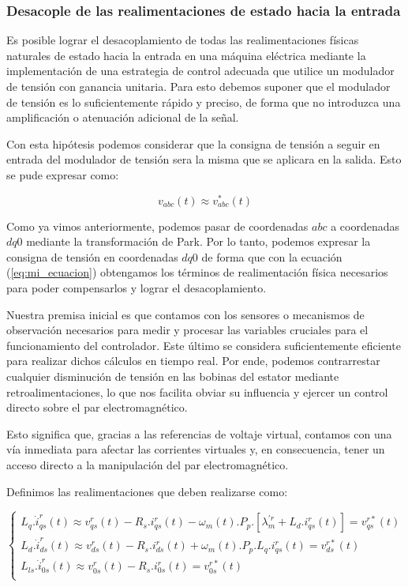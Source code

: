 \documentclass{article}
\begin{document}

\subsubsection{Desacople de las realimentaciones de estado hacia la entrada}

Es posible lograr el desacoplamiento de todas las realimentaciones físicas naturales de 
estado hacia la entrada en una máquina eléctrica mediante la implementación de una estrategia 
de control adecuada que utilice un modulador de tensión con ganancia unitaria. Para esto debemos 
suponer que el modulador de tensión es lo suficientemente rápido y preciso, de forma que no 
introduzca una amplificación o atenuación adicional de la señal. 

Con esta hipótesis podemos considerar que la consigna de tensión a seguir en entrada del modulador 
de tensión sera la misma que se aplicara en la salida. Esto se pude expresar como: 

\begin{equation}
    v_{abc}(t) \approx v^*_{abc}(t)
\end{equation}

Como ya vimos anteriormente, podemos pasar de coordenadas $abc$ a coordenadas $dq0$ mediante la
transformación de Park. Por lo tanto, podemos expresar la consigna de tensión en coordenadas $dq0$
de forma que con la ecuación (\ref{eq:mi_ecuacion}) obtengamos los términos de  realimentación física 
necesarios para poder compensarlos y lograr el desacoplamiento.

Nuestra premisa inicial es que contamos con los sensores o mecanismos de observación necesarios para 
medir y procesar las variables cruciales para el funcionamiento del controlador. Este último se 
considera suficientemente eficiente para realizar dichos cálculos en tiempo real. Por ende, podemos 
contrarrestar cualquier disminución de tensión en las bobinas del estator mediante retroalimentaciones, 
lo que nos facilita obviar su influencia y ejercer un control directo sobre el par electromagnético.

Esto significa que, gracias a las referencias de voltaje virtual, contamos con una vía inmediata para 
afectar las corrientes virtuales y, en consecuencia, tener un acceso directo a la manipulación del par 
electromagnético.

Definimos las realimentaciones que deben realizarse como:

\begin{equation}\label{eq:compensaciones}
    \begin{cases}
        L_q.\dot{i}^r_{qs}(t) \approx v^{r}_{qs}(t) - R_{s}.i_{qs}^r(t) - \omega_m(t).P_p.[\lambda^{\prime r}_m + L_d.i_{qs}^r(t)] = v^{r*}_{qs}(t)\\
        L_d.\dot{i}^r_{ds}(t) \approx v^{r}_{ds}(t) - R_{s}.i_{ds}^r(t) + \omega_m(t).P_p.L_q.i_{qs}^r(t) = v^{r*}_{ds}(t)\\
        L_{ls}.\dot{i}^r_{0s}(t) \approx v^{r}_{0s}(t) - R_{s}.i_{0s}^r(t) = v^{r*}_{0s}(t)\\
    \end{cases}
\end{equation}
\end{document}
